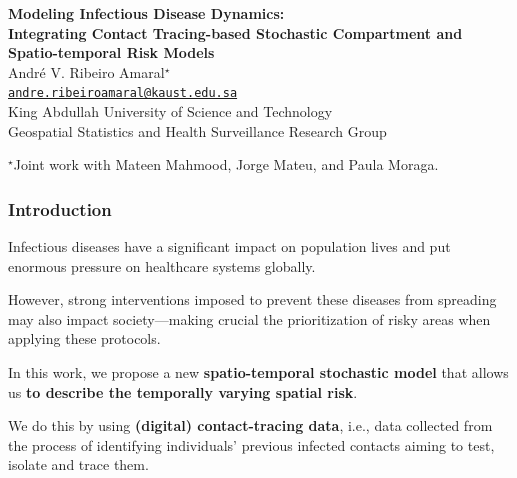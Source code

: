 \documentclass[12pt, aspectratio = 169]{beamer} %
\author{André Victor Ribeiro Amaral \\ \href{mailto:andre.ribeiroamaral@kaust.edu.sa}{andre.ribeiroamaral@kaust.edu.sa}}
\begin{document}
	\AtBeginSection{}
	
	
	{
		\begin{frame}[t]
			\centering
			\vspace{32pt}
			\textbf{{\large {} Modeling Infectious Disease Dynamics:\\Integrating Contact Tracing-based Stochastic Compartment and Spatio-temporal Risk Models}} \\
			\vspace{18pt}
			{\normalsize André V.\hspace{-1pt} Ribeiro\hspace{-1pt} Amaral\hspace{1pt}${}^{\star}$}\\
			{\scriptsize\texttt{\href{mailto:andre.ribeiroamaral@kaust.edu.sa}{andre.ribeiroamaral@kaust.edu.sa}}} \\
			\vspace{18pt}
			{\small King Abdullah University of Science and Technology}\\
			{\small Geospatial Statistics and Health Surveillance Research Group} \\
			\vspace{12pt}
			\begin{flushleft} {${}^{\star}$\hspace{1pt}\scriptsize Joint work with Mateen Mahmood, Jorge Mateu, and Paula Moraga.}\end{flushleft}
		\end{frame}
	}
	
	
	\begin{frame}[t]
		\frametitle{Introduction}
		\justifying
		Infectious diseases have a significant impact on population lives and put enormous pressure on healthcare systems globally. 
		
		However, strong interventions imposed to prevent these diseases from spreading may also impact society---making crucial the prioritization of risky areas when applying these protocols.
	
		\pause
	
		In this work, we propose a new \textbf{spatio-temporal stochastic model} that allows us \textbf{to describe the temporally varying spatial risk}. 
		
		We do this by using \textbf{(digital) contact-tracing data}, i.e., data collected from the process of identifying individuals' previous infected contacts aiming to test, isolate and trace them.
	\end{frame}
\end{document}
